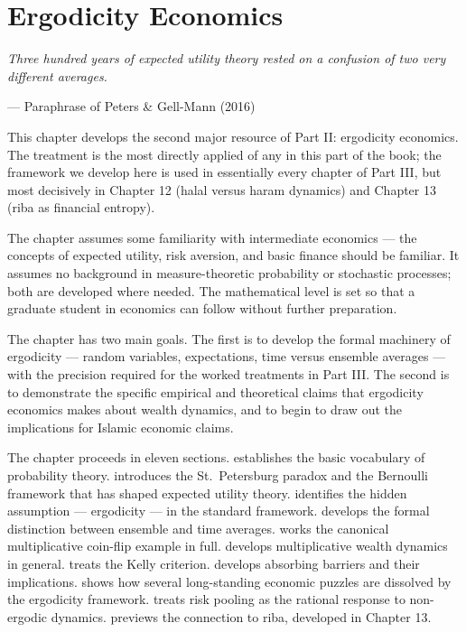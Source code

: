\chapter{Ergodicity Economics}
\label{ch:ergodicity}

\epigraph{\itshape Three hundred years of expected utility theory
rested on a confusion of two very different averages.}{--- Paraphrase
of Peters \& Gell-Mann (2016)}

\noindent
This chapter develops the second major resource of Part II:
ergodicity economics. The treatment is the most directly applied of
any in this part of the book; the framework we develop here is used
in essentially every chapter of Part III, but most decisively in
Chapter 12 (halal versus haram dynamics) and Chapter 13 (riba as
financial entropy).

The chapter assumes some familiarity with intermediate economics ---
the concepts of expected utility, risk aversion, and basic finance
should be familiar. It assumes no background in measure-theoretic
probability or stochastic processes; both are developed where
needed. The mathematical level is set so that a graduate student in
economics can follow without further preparation.

The chapter has two main goals. The first is to develop the formal
machinery of ergodicity --- random variables, expectations, time
versus ensemble averages --- with the precision required for the
worked treatments in Part III. The second is to demonstrate the
specific empirical and theoretical claims that ergodicity economics
makes about wealth dynamics, and to begin to draw out the
implications for Islamic economic claims.

The chapter proceeds in eleven sections.
 establishes the basic vocabulary of
probability theory.
 introduces the St.\ Petersburg paradox
and the Bernoulli framework that has shaped expected utility theory.
 identifies the hidden assumption ---
ergodicity --- in the standard framework.
 develops the formal distinction between
ensemble and time averages.
 works the canonical multiplicative coin-flip
example in full.
 develops multiplicative wealth
dynamics in general.
 treats the Kelly criterion.
 develops absorbing barriers and their
implications.
 shows how several long-standing economic
puzzles are dissolved by the ergodicity framework.
 treats risk pooling as the rational response
to non-ergodic dynamics.
 previews the connection to riba, developed
in Chapter 13.

